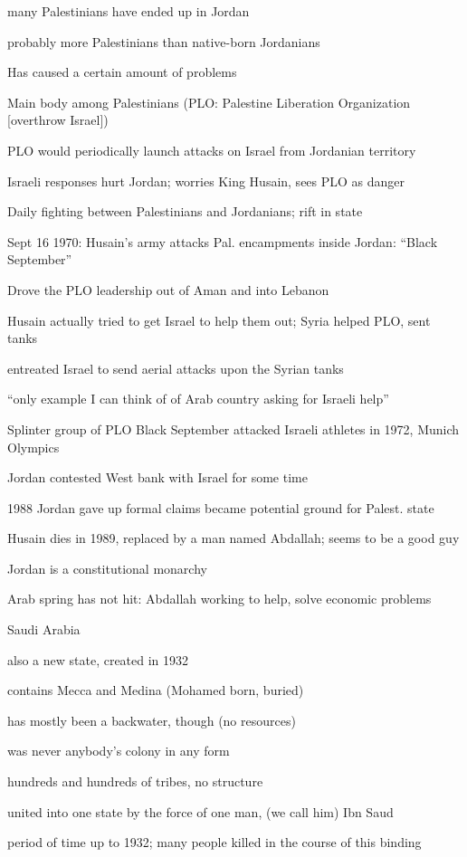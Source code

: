 \documentclass[12pt]{article}
\begin{document}
many Palestinians have ended up in Jordan

probably more Palestinians than native-born Jordanians

Has caused a certain amount of problems

Main body among Palestinians (PLO: Palestine Liberation Organization [overthrow Israel])

PLO would periodically launch attacks on Israel from Jordanian territory

Israeli responses hurt Jordan; worries King Husain, sees PLO as danger

Daily fighting between Palestinians and Jordanians; rift in state

Sept 16 1970: Husain's army attacks Pal. encampments inside Jordan: ``Black September''

Drove the PLO leadership out of Aman and into Lebanon

Husain actually tried to get Israel to help them out; Syria helped PLO, sent tanks

entreated Israel to send aerial attacks upon the Syrian tanks

``only example I can think of of Arab country asking for Israeli help''

Splinter group of PLO Black September attacked Israeli athletes in 1972, Munich Olympics

Jordan contested West bank with Israel for some time

1988 Jordan gave up formal claims became potential ground for Palest. state

Husain dies in 1989, replaced by a man named Abdallah; seems to be a good guy

Jordan is a constitutional monarchy

Arab spring has not hit: Abdallah working to help, solve economic problems

\noindent
Saudi Arabia

also a new state, created in 1932

contains Mecca and Medina (Mohamed born, buried)

has mostly been a backwater, though (no resources)

was never anybody's colony in any form

hundreds and hundreds of tribes, no structure

united into one state by the force of one man, (we call him) Ibn Saud

period of time up to 1932; many people killed in the course of this binding
\end{document}
